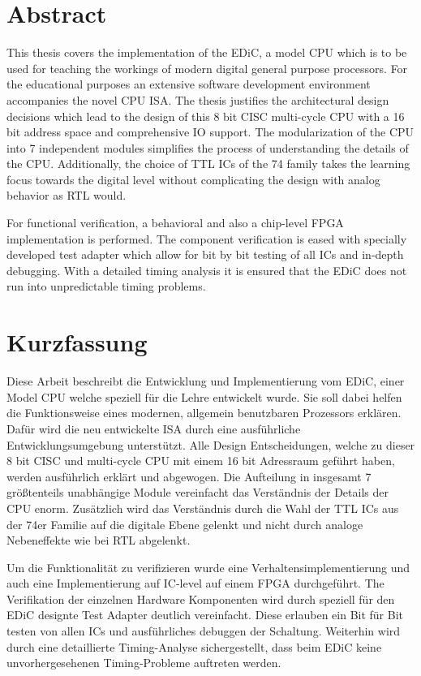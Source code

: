 \chapter*{Abstract}
This thesis covers the implementation of the \gls{EDiC}, a model \gls{CPU} which is to be used for teaching the workings of modern digital general purpose processors.
For the educational purposes an extensive software development environment accompanies the novel \gls{CPU} \gls{ISA}.
The thesis justifies the architectural design decisions which lead to the design of this 8 bit \gls{CISC} multi-cycle \gls{CPU} with a 16 bit address space and comprehensive \gls{IO} support.
The modularization of the \gls{CPU} into 7 independent modules simplifies the process of understanding the details of the \gls{CPU}.
Additionally, the choice of \gls{TTL} \glspl{IC} of the 74 family takes the learning focus towards the digital level without complicating the design with analog behavior as \gls{RTL} would.

For functional verification, a behavioral and also a chip-level \gls{FPGA} implementation is performed.
The component verification is eased with specially developed test adapter which allow for bit by bit testing of all \glspl{IC} and in-depth debugging.
With a detailed timing analysis it is ensured that the \gls{EDiC} does not run into unpredictable timing problems.
\begingroup
\renewcommand{\cleardoublepage}{}
\clearpage
\chapter*{Kurzfassung}
\endgroup
\glsresetall
Diese Arbeit beschreibt die Entwicklung und Implementierung vom \gls{EDiC}, einer Model \gls{CPU} welche speziell für die Lehre entwickelt wurde.
Sie soll dabei helfen die Funktionsweise eines modernen, allgemein benutzbaren Prozessors erklären.
Dafür wird die neu entwickelte \gls{ISA} durch eine ausführliche Entwicklungsumgebung unterstützt.
Alle Design Entscheidungen, welche zu dieser 8 bit \gls{CISC} und multi-cycle \gls{CPU} mit einem 16 bit Adressraum geführt haben, werden ausführlich erklärt und abgewogen.
Die Aufteilung in insgesamt 7 größtenteils unabhängige Module vereinfacht das Verständnis der Details der \gls{CPU} enorm.
Zusätzlich wird das Verständnis durch die Wahl der \gls{TTL} \glspl{IC} aus der 74er Familie auf die digitale Ebene gelenkt und nicht durch analoge Nebeneffekte wie bei \gls{RTL} abgelenkt.

Um die Funktionalität zu verifizieren wurde eine Verhaltensimplementierung und auch eine Implementierung auf \gls{IC}-level auf einem \gls{FPGA} durchgeführt.
The Verifikation der einzelnen Hardware Komponenten wird durch speziell für den \gls{EDiC} designte Test Adapter deutlich vereinfacht.
Diese erlauben ein Bit für Bit testen von allen \glspl{IC} und ausführliches debuggen der Schaltung.
Weiterhin wird durch eine detaillierte Timing-Analyse sichergestellt, dass beim \gls{EDiC} keine unvorhergesehenen Timing-Probleme auftreten werden.